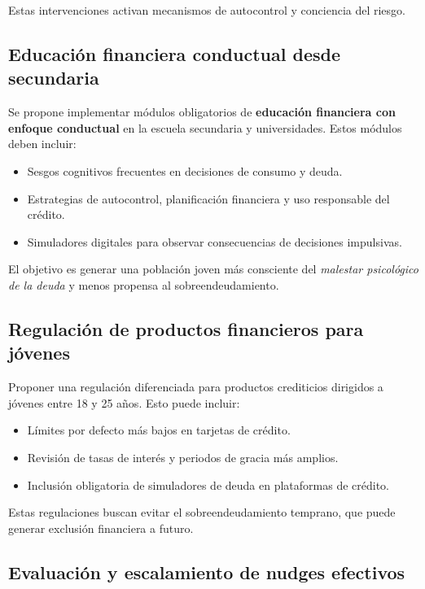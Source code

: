 \documentclass[10pt]{article}
\begin{document}
\begin{multicols}{2}
Estas intervenciones activan mecanismos de autocontrol y conciencia del riesgo.

\vspace{0.5em}

\subsection{Educación financiera conductual desde secundaria}

Se propone implementar módulos obligatorios de \textbf{educación financiera con enfoque conductual} en la escuela secundaria y universidades. Estos módulos deben incluir:
\begin{itemize}
    \item Sesgos cognitivos frecuentes en decisiones de consumo y deuda.
    \item Estrategias de autocontrol, planificación financiera y uso responsable del crédito.
    \item Simuladores digitales para observar consecuencias de decisiones impulsivas.
\end{itemize}

El objetivo es generar una población joven más consciente del \textit{malestar psicológico de la deuda} y menos propensa al sobreendeudamiento.

\vspace{0.5em}

\subsection{Regulación de productos financieros para jóvenes}

Proponer una regulación diferenciada para productos crediticios dirigidos a jóvenes entre 18 y 25 años. Esto puede incluir:
\begin{itemize}
    \item Límites por defecto más bajos en tarjetas de crédito.
    \item Revisión de tasas de interés y periodos de gracia más amplios.
    \item Inclusión obligatoria de simuladores de deuda en plataformas de crédito.
\end{itemize}

Estas regulaciones buscan evitar el sobreendeudamiento temprano, que puede generar exclusión financiera a futuro.

\vspace{0.5em}

\subsection{Evaluación y escalamiento de nudges efectivos}


\end{multicols}
\end{document}
